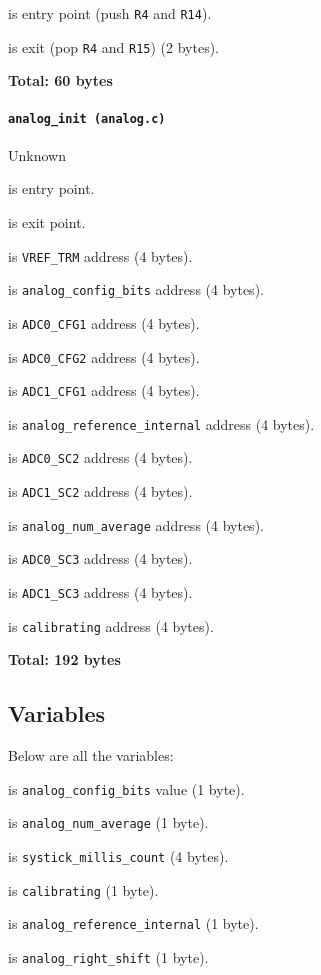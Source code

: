  is entry point (push \texttt{R4} and \texttt{R14}).

 is exit (pop \texttt{R4} and \texttt{R15}) (2 bytes).

\textbf{Total: 60 bytes}

\paragraph{\texttt{analog\_init (analog.c)}} Unknown

 is entry point.

 is exit point.

 is \texttt{VREF\_TRM} address (4 bytes).

 is \texttt{analog\_config\_bits} address (4 bytes).

 is \texttt{ADC0\_CFG1} address (4 bytes).

 is \texttt{ADC0\_CFG2} address (4 bytes).

 is \texttt{ADC1\_CFG1} address (4 bytes).

 is \texttt{analog\_reference\_internal} address
(4 bytes).

 is \texttt{ADC0\_SC2} address (4 bytes).

 is \texttt{ADC1\_SC2} address (4 bytes).

 is \texttt{analog\_num\_average} address (4 bytes).

 is \texttt{ADC0\_SC3} address (4 bytes).

 is \texttt{ADC1\_SC3} address (4 bytes).

 is \texttt{calibrating} address (4 bytes).

\textbf{Total: 192 bytes}

\subsection{Variables}

Below are all the variables:

\vspace{1em}

 is \texttt{analog\_config\_bits} value (1 byte).

 is \texttt{analog\_num\_average} (1 byte).

 is \texttt{systick\_millis\_count} (4 bytes).

 is \texttt{calibrating} (1 byte).

 is \texttt{analog\_reference\_internal} (1 byte).

 is \texttt{analog\_right\_shift} (1 byte).
